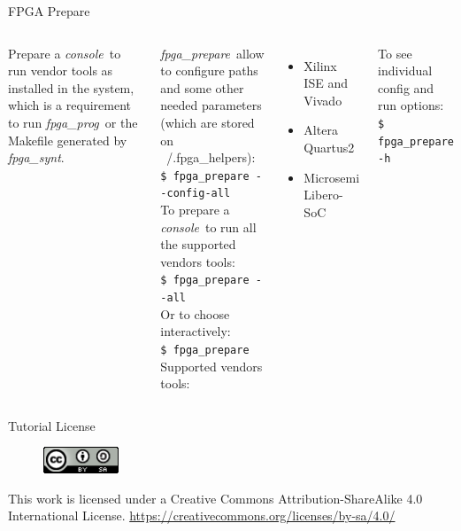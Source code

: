 \documentclass{beamer}
\newcommand{\fpgaprepare}    {\textit{fpga\_prepare}}
\newcommand{\fpgasynt}       {\textit{fpga\_synt}}
\newcommand{\fpgaprog}       {\textit{fpga\_prog}}
\newcommand{\console}        {\textit{console}}
\newcommand{\shellcmd}[1]{\\\indent\indent\texttt{\scriptsize #1}\\}
\begin{document}
\begin{frame}{FPGA Prepare}
  \begin{columns}
      \begin{exampleblock}{}
        Prepare a \console\ to run vendor tools as installed in the system,
        which is a requirement to run \fpgaprog\ or the Makefile generated by \fpgasynt.
      \end{exampleblock}
      \fpgaprepare\ allow to configure paths and some other needed parameters (which are
      stored on ~/.fpga\_helpers):
      \shellcmd{\$ fpga\_prepare -{}-config-all}
      To prepare a \console\ to run all the supported vendors tools:
      \shellcmd{\$ fpga\_prepare -{}-all}
      Or to choose interactively:
      \shellcmd{\$ fpga\_prepare}
      Supported vendors tools:
      \begin{itemize}
        \item Xilinx ISE and Vivado
        \item Altera Quartus2
        \item Microsemi Libero-SoC
      \end{itemize}
      To see individual config and run options:
      \shellcmd{\$ fpga\_prepare -h}
  \end{columns}
\end{frame}


\begin{frame}{Tutorial License}
  \begin{figure}[!t]
    \includegraphics[width=0.2\textwidth]{../images/cc-by-sa.png}
  \end{figure}
  \centering
  This work is licensed under a Creative Commons Attribution-ShareAlike 4.0 International License.
  \url{https://creativecommons.org/licenses/by-sa/4.0/}
\end{frame}
\end{document}

